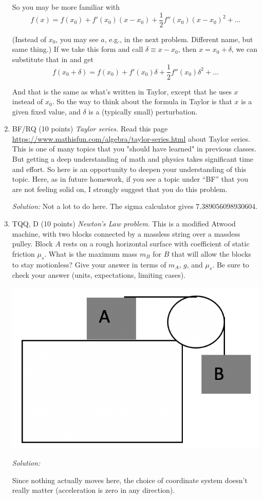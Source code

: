\documentclass[12pt]{article}
\newcommand{\soln}[1] {\textit{Solution:} #1}
\begin{document}
\begin{enumerate}
{So you may be more familiar with
$$f(x) = f(x_0) + f'(x_0)(x-x_0) + \frac{1}{2} f''(x_0) (x-x_0)^2 + \ldots$$

(Instead of $x_0$, you may see $a$, e.g., in the next problem. Different name, but same thing.) If we take this form and call $\delta \equiv x-x_0$, then $x = x_0 + \delta$, we can substitute that in and get
$$f(x_0 + \delta) = f(x_0) + f'(x_0)\delta + \frac{1}{2} f''(x_0)\delta^2 + \ldots$$

And that is the same as what's written in Taylor, except that he uses $x$ instead of $x_0$. So the way to think about the formula in Taylor is that $x$ is a given fixed value, and $\delta$ is a (typically small) perturbation.
}

\item BF/RQ (10 points) \textit{Taylor series.} Read this page \url{https://www.mathisfun.com/algebra/taylor-series.html} about Taylor series. This is one of many topics that you "should have learned" in previous classes. But getting a deep understanding of math and physics takes significant time and effort. So here is an opportunity to deepen your understanding of this topic.  Here, as in future homework, if you see a topic under “BF” that you are not feeling solid on, I strongly suggest that you do this problem.

\soln{Not a lot to do here. The sigma calculator gives $7.389056098930604$.}

\item	TQQ, D (10 points) \textit{Newton's Law problem.}  This is a modified Atwood machine, with two blocks connected by a massless string over a massless pulley.  Block $A$ rests on a rough horizontal surface with coefficient of static friction $\mu_s$.  What is the maximum mass $m_B$ for $B$ that will allow the blocks to stay motionless?  Give your answer in terms of $m_A$, $g$, and $\mu_s$.  Be sure to check your answer (units, expectations, limiting cases).

\centerline{\includegraphics[width=.3\textwidth]{modified_atwood.png}}

\soln{

Since nothing actually moves here, the choice of coordinate system doesn't really matter (acceleration is zero in any direction).

}
\end{enumerate}
\end{document}
